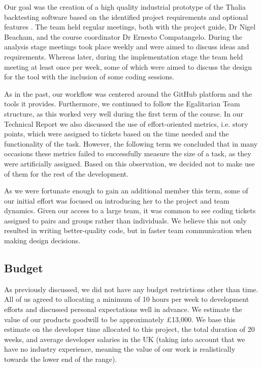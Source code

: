 \documentclass[main.tex]{subfiles}
\begin{document}
Our goal was the creation of a high quality industrial prototype of the Thalia backtesting software based on the identified project requirements \cite{TR} and optional features \cite{TR}. The team held regular meetings, both with the project guide, Dr Nigel Beacham, and the course coordinator Dr Ernesto Compatangelo. During the analysis stage meetings took place weekly and were aimed to discuss ideas and requirements. Whereas later, during the implementation stage the team held meeting at least once per week, some of which were aimed to discuss the design for the tool with the inclusion of some coding sessions.

As in the past\cite{TR}, our workflow was centered around the GitHub platform and the tools it provides.
Furthermore, we continued to follow the Egalitarian Team structure, as this worked very well during the first term of the course.
In our Technical Report \cite{TR} we also discussed the use of effort-oriented metrics, i.e. story points, which were assigned to tickets based on the time needed and the functionality of the task.
However, the following term we concluded that in many occasions these metrics failed to successfully measure the size of a task, as they were artificially assigned. Based on this observation, we decided not to make use of them for the rest of the development.

As we were fortunate enough to gain an additional member this term, some of our initial effort was focused on introducing her to the project and team dynamics. Given our access to a large team, it was common to see coding tickets assigned to pairs and groups rather than individuals. We believe this not only resulted in writing better-quality code, but in faster team communication when making design decisions.

\subsection{Budget}
As previously discussed, we did not have any budget restrictions other than time. All of us agreed to allocating a minimum of 10 hours per week to development efforts and discussed personal expectations well in advance.  We estimate the value of our products goodwill to be approximately £13,000. We base this estimate on the developer time allocated to this project, the total duration of 20 weeks, and average developer salaries in the UK\cite{DeveloperSalary} (taking into account that we have no industry experience, meaning the value of our work is realistically towards the lower end of the range).
\end{document}
